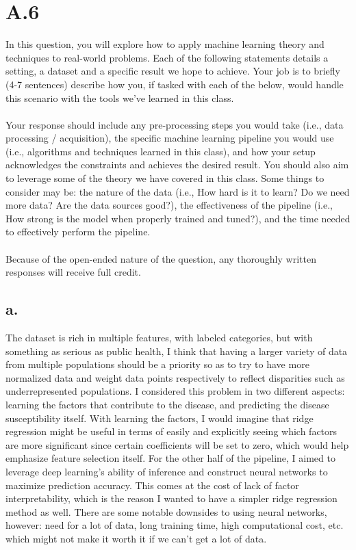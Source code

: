\documentclass{article}
\newcommand{\1}{\mathbf{1}}
\begin{document}
\section*{A.6}
{\Large 

In this question, you will explore how to apply machine learning theory and techniques to real-world problems. Each of the following statements details a setting, a dataset and a specific result we hope to achieve. Your job is to briefly (4-7 sentences) describe how you, if tasked with each of the below, would handle this scenario with the tools we’ve learned in this class. \\ \\
Your response should include any pre-processing steps you would take (i.e., data processing / acquisition), the specific machine learning pipeline you would use (i.e., algorithms and techniques learned in this class), and how your setup acknowledges the constraints and achieves the desired result. You should also aim to leverage some of the theory we have covered in this class. Some things to consider may be: the nature of the data (i.e., How hard is it to learn? Do we need more data? Are the data sources good?), the effectiveness of the pipeline (i.e., How strong is the model when properly trained and tuned?), and the time needed to effectively perform the pipeline. \\ \\
Because of the open-ended nature of the question, any thoroughly written responses will receive full credit.

\subsection*{a.}

The dataset is rich in multiple features, with labeled categories, but with something as serious as public health, I think that having a larger variety of data from multiple populations should be a priority so as to try to have more normalized data and weight data points respectively to reflect disparities such as underrepresented populations. I considered this problem in two different aspects: learning the factors that contribute to the disease, and predicting the disease susceptibility itself. With learning the factors, I would imagine that ridge regression might be useful in terms of easily and explicitly seeing which factors are more significant since certain coefficients will be set to zero, which would help emphasize feature selection itself. For the other half of the pipeline, I aimed to leverage deep learning's ability of inference and construct neural networks to maximize prediction accuracy. This comes at the cost of lack of factor interpretability, which is the reason I wanted to have a simpler ridge regression method as well. There are some notable downsides to using neural networks, however: need for a lot of data, long training time, high computational cost, etc. which might not make it worth it if we can't get a lot of data. 

}
\end{document}
